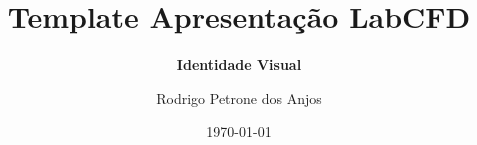 
\title[{Template Apresentação LabCFD}]
{\color{beamer@Blue} \textbf{Template Apresentação LabCFD}}%
\subtitle{\color{beamer@Blue} \textbf{Identidade Visual}}
\author[Rodrigo Petrone dos Anjos]{\large{Rodrigo Petrone dos Anjos}} %
\date{\today}
